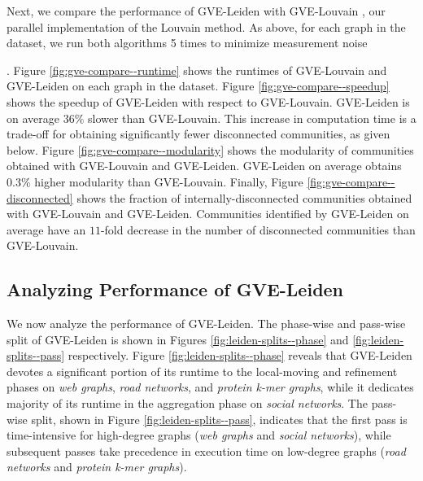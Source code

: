 
Next, we compare the performance of GVE-Leiden with GVE-Louvain \cite{sahu2023gvelouvain}, our parallel implementation of the Louvain method. As above, for each graph in the dataset, we run both algorithms 5 times to minimize measurement noise. Figure \ref{fig:gve-compare--runtime} shows the runtimes of GVE-Louvain and GVE-Leiden on each graph in the dataset. Figure \ref{fig:gve-compare--speedup} shows the speedup of GVE-Leiden with respect to GVE-Louvain. GVE-Leiden is on average $36\%$ slower than GVE-Louvain. This increase in computation time is a trade-off for obtaining significantly fewer disconnected communities, as given below. Figure \ref{fig:gve-compare--modularity} shows the modularity of communities obtained with GVE-Louvain and GVE-Leiden. GVE-Leiden on average obtains $0.3\%$ higher modularity than GVE-Louvain. Finally, Figure \ref{fig:gve-compare--disconnected} shows the fraction of internally-disconnected communities obtained with GVE-Louvain and GVE-Leiden. Communities identified by GVE-Leiden on average have an $11$-fold decrease in the number of disconnected communities than GVE-Louvain.








\subsection{Analyzing Performance of GVE-Leiden}

We now analyze the performance of GVE-Leiden. The phase-wise and pass-wise split of GVE-Leiden is shown in Figures \ref{fig:leiden-splits--phase} and \ref{fig:leiden-splits--pass} respectively. Figure \ref{fig:leiden-splits--phase} reveals that GVE-Leiden devotes a significant portion of its runtime to the local-moving and refinement phases on \textit{web graphs}, \textit{road networks}, and \textit{protein k-mer graphs}, while it dedicates majority of its runtime in the aggregation phase on \textit{social networks}. The pass-wise split, shown in Figure \ref{fig:leiden-splits--pass}, indicates that the first pass is time-intensive for high-degree graphs (\textit{web graphs} and \textit{social networks}), while subsequent passes take precedence in execution time on low-degree graphs (\textit{road networks} and \textit{protein k-mer graphs}).

